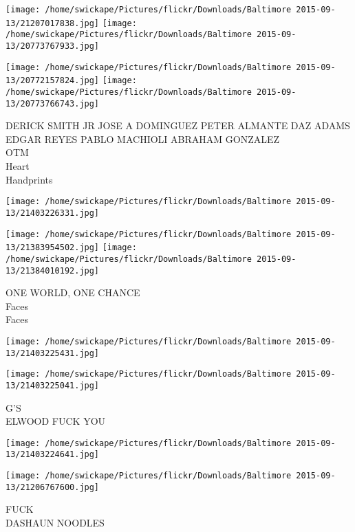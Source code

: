 \documentclass[10pt,letterpaper]{article}
\begin{document}
\texttt{[image: /home/swickape/Pictures/flickr/Downloads/Baltimore 2015-09-13/21207017838.jpg]}
\texttt{[image: /home/swickape/Pictures/flickr/Downloads/Baltimore 2015-09-13/20773767933.jpg]}

\texttt{[image: /home/swickape/Pictures/flickr/Downloads/Baltimore 2015-09-13/20772157824.jpg]}
\texttt{[image: /home/swickape/Pictures/flickr/Downloads/Baltimore 2015-09-13/20773766743.jpg]}

DERICK SMITH JR JOSE A DOMINGUEZ PETER ALMANTE DAZ ADAMS EDGAR REYES PABLO MACHIOLI ABRAHAM GONZALEZ\\
OTM\\
Heart\\
Handprints\\
\pagebreak

\texttt{[image: /home/swickape/Pictures/flickr/Downloads/Baltimore 2015-09-13/21403226331.jpg]}

\vspace{0.25in}
\texttt{[image: /home/swickape/Pictures/flickr/Downloads/Baltimore 2015-09-13/21383954502.jpg]}
\texttt{[image: /home/swickape/Pictures/flickr/Downloads/Baltimore 2015-09-13/21384010192.jpg]}

ONE WORLD, ONE CHANCE\\
Faces\\
Faces\\
\pagebreak

\texttt{[image: /home/swickape/Pictures/flickr/Downloads/Baltimore 2015-09-13/21403225431.jpg]}

\vspace{0.25in}
\texttt{[image: /home/swickape/Pictures/flickr/Downloads/Baltimore 2015-09-13/21403225041.jpg]}

G'S\\
ELWOOD FUCK YOU\\
\pagebreak

\texttt{[image: /home/swickape/Pictures/flickr/Downloads/Baltimore 2015-09-13/21403224641.jpg]}

\vspace{0.25in}
\texttt{[image: /home/swickape/Pictures/flickr/Downloads/Baltimore 2015-09-13/21206767600.jpg]}

FUCK\\
DASHAUN NOODLES\\
\pagebreak
\end{document}
